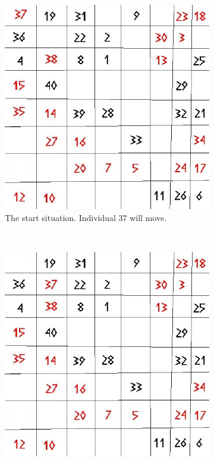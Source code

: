 \begin{figure}[H]
    \centering
    \begin{subfigure}{0.3\textwidth}
        \includegraphics[width=\textwidth]{segregation_tegenvb.jpg}
        \caption{The start situation. Individual $37$ will move.}
        \label{fig:movement1}
    \end{subfigure}\hspace{1cm}
    ~ %
    \begin{subfigure}{0.3\textwidth}
        \includegraphics[width=\textwidth]{segregation_tegenvb_1.jpg}

\end{subfigure}
\end{figure}
